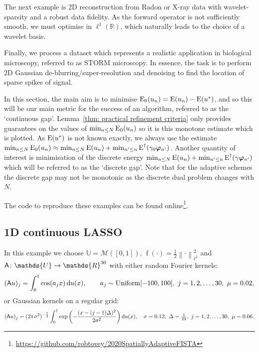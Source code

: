 \documentclass[smallextended]{svjour3}
\let\F\mathds\let\C\mathcal\newcommand{\R}{\F{R}}\newcommand{\A}{\tens{A}}
\newcommand{\norm}[1]{{\left\lVert #1 \right\rVert}}
\newcommand{\op}[1]{\operatorname{#1}}
\newcommand{\1}{\F{1}}
\newcommand{\diff}{\mathop{}\!\mathrm{d}}
\newcommand*{\var}[1]{%
	\IfEqCase{#1}{%
		{0}{u}%
		{1}{v}%
		{2}{w}%
	}[u#1]%
}
\newcommand*{\vars}[1]{%
	\IfEqCase{#1}{%
		{0}{\alpha}%
		{1}{\beta}%
		{2}{\gamma}%
		{3}{a}%
		{4}{b}%
		{5}{c}%
	}[k#1]%
}
\begin{document}
	The next example is 2D reconstruction from Radon or X-ray data with wavelet-sparsity and a robust data fidelity. As the forward operator is not sufficiently smooth, we must optimise in $\ell^1(\R)$, which naturally leads to the choice of a wavelet basis. 
	
	Finally, we process a dataset which represents a realistic application in biological microscopy, referred to as STORM microscopy. In essence, the task is to perform 2D Gaussian de-blurring/super-resolution and denoising to find the location of sparse spikes of signal.
	
	In this section, the main aim is to minimise $\op{E}_0(\var0_n) = \op{E}(\var0_n)-\op{E}(\var0^*)$, and so this will be our main metric for the success of an algorithm, referred to as the `continuous gap'. Lemma~\ref{thm: practical refinement criteria} only provides guarantees on the values of $\min_{n\leq N}\op{E}_0(\var0_n)$ so it is this monotone estimate which is plotted. As $\op{E}(\var0^*)$ is not known exactly, we always use the estimate $\min_{n\leq N}\op{E}_0(\var0_n) \approx \min_{n\leq N}\op{E}(\var0_n) + \min_{n'\leq n}\op{E}^\dag(\vars2_0\vec{\varphi}_{n'})$. Another quantity of interest is minimisation of the discrete energy $\min_{n\leq N}\op{E}(\var0_n) + \min_{n'\leq n}\op{E}^\dag(\vars2\vec{\varphi}_{n'})$ which will be referred to as the `discrete gap'. Note that for the adaptive schemes the discrete gap may not be monotonic as the discrete dual problem changes with $N$.
	
	The code to reproduce these examples can be found online\footnote{\href{https://github.com/robtovey/2020SpatiallyAdaptiveFISTA}{https://github.com/robtovey/2020SpatiallyAdaptiveFISTA}}.
	
	
	\subsection{1D continuous LASSO}\label{sec: 1D Lasso examples}
	In this example we choose $\F{U}=\C M([0,1])$, $\op{f}(\cdot)=\frac12\norm{\cdot}_{\ell^2}^2$ and $\A\colon \F{U}\to \R^{30}$ with either random Fourier kernels:
	\begin{equation}
		(\A\var0)_j = \int_0^1\cos(\vars3_jx)\diff\var0(x), \qquad \vars3_j\sim \op{Uniform}[-100,100],\ j=1,2,\ldots,30,\ \mu =0.02, 
	\end{equation}
	or Gaussian kernels on a regular grid:
	\begin{equation}
		(\A\var0)_j = (2\pi\sigma^2)^{-\frac12}\int_0^1\exp\left(-\frac{(x-(j-1)\Delta)^2}{2\sigma^2}\right)\diff\var0(x), \quad \sigma=0.12,\ \Delta = \tfrac1{29},\ j=1,2,\ldots,30,\ \mu=0.06.
	\end{equation}
	
\end{document}
